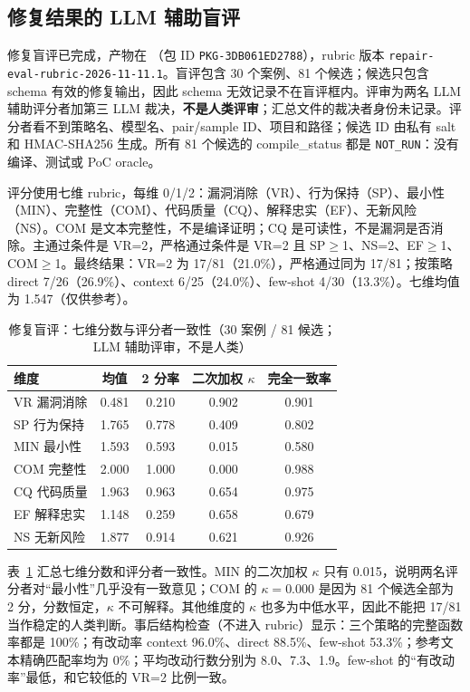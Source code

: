 \documentclass[conference]{IEEEtran}
\begin{document}
\subsection{修复结果的 LLM 辅助盲评}
\label{sec:human-review}
修复盲评已完成，产物在 （包 ID \texttt{PKG-3DB061ED2788}），rubric 版本 \texttt{repair-eval-rubric-2026-11-11.1}。盲评包含 30 个案例、81 个候选；候选只包含 schema 有效的修复输出，因此 schema 无效记录不在盲评框内。评审为两名 LLM 辅助评分者加第三 LLM 裁决，\textbf{不是人类评审}；汇总文件的裁决者身份未记录。评分者看不到策略名、模型名、pair/sample ID、项目和路径；候选 ID 由私有 salt 和 HMAC-SHA256 生成。所有 81 个候选的 compile\_status 都是 \texttt{NOT\_RUN}：没有编译、测试或 PoC oracle。

评分使用七维 rubric，每维 0/1/2：漏洞消除（VR）、行为保持（SP）、最小性（MIN）、完整性（COM）、代码质量（CQ）、解释忠实（EF）、无新风险（NS）。COM 是文本完整性，不是编译证明；CQ 是可读性，不是漏洞是否消除。主通过条件是 VR=2，严格通过条件是 VR=2 且 SP$\ge$1、NS=2、EF$\ge$1、COM$\ge$1。最终结果：VR=2 为 17/81（21.0\%），严格通过同为 17/81；按策略 direct 7/26（26.9\%）、context 6/25（24.0\%）、few-shot 4/30（13.3\%）。七维均值为 1.547（仅供参考）。

\begin{table}[t]
\caption{修复盲评：七维分数与评分者一致性（30 案例 / 81 候选；LLM 辅助评审，不是人类）}
\label{tab:blind}
\centering
\small
\begin{tabular}{@{}lcccc@{}}
\toprule
维度 & 均值 & 2 分率 & 二次加权 $\kappa$ & 完全一致率\\
\midrule
VR 漏洞消除 & 0.481 & 0.210 & 0.902 & 0.901\\
SP 行为保持 & 1.765 & 0.778 & 0.409 & 0.802\\
MIN 最小性 & 1.593 & 0.593 & 0.015 & 0.580\\
COM 完整性 & 2.000 & 1.000 & 0.000 & 0.988\\
CQ 代码质量 & 1.963 & 0.963 & 0.654 & 0.975\\
EF 解释忠实 & 1.148 & 0.259 & 0.658 & 0.679\\
NS 无新风险 & 1.877 & 0.914 & 0.621 & 0.926\\
\bottomrule
\end{tabular}
\end{table}

表~\ref{tab:blind} 汇总七维分数和评分者一致性。MIN 的二次加权 $\kappa$ 只有 0.015，说明两名评分者对“最小性”几乎没有一致意见；COM 的 $\kappa=0.000$ 是因为 81 个候选全部为 2 分，分数恒定，$\kappa$ 不可解释。其他维度的 $\kappa$ 也多为中低水平，因此不能把 17/81 当作稳定的人类判断。事后结构检查（不进入 rubric）显示：三个策略的完整函数率都是 100\%；有改动率 context 96.0\%、direct 88.5\%、few-shot 53.3\%；参考文本精确匹配率均为 0\%；平均改动行数分别为 8.0、7.3、1.9。few-shot 的“有改动率”最低，和它较低的 VR=2 比例一致。
\end{document}
